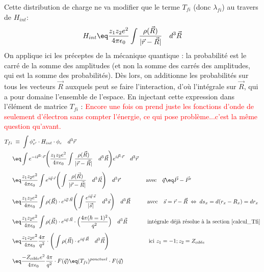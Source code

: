 Cette distribution de charge ne va modifier que le terme $T_{fi}$ (donc $\lambda_{fi}$) au travers de $H_{int}$:
$$H_{int} \eq \frac{z_1z_2e^2}{4\pi\epsilon_0} \int \frac{\rho(\vec{R})}{|\vec{r} - \vec{R}|} \quad d^3\vec{R}$$ On applique ici les préceptes de la mécanique quantique : la probabilité est le carré de la somme des amplitudes (et non la somme des carrés des amplitudes, qui est la somme des probabilités). Dès lors, on additionne les probabilités sur tous les vecteurs $\vec{R}$ auxquels peut se faire l'interaction, d'où l'intégrale sur $\vec{R}$, qui a pour domaine l'ensemble de l'espace. En injectant cette expression dans l'élément de matrice $T_{fi}$ : \textcolor{red}{Encore une fois on prend juste les fonctions d'onde de seulement d'électron sans compter l'énergie, ce qui pose problème...c'est la même question qu'avant.}
\begin{align*}
    T_{fi} 
&\; \equiv \;
    \int \phi^*_{e'} \cdot H_{int} \cdot \phi_e \quad d^3\vec{r}\\
&\eq 
    \int 
    e^{-i\vec{P'} \cdot\vec{r}}
    \Bigg(
        \dfrac{z_1z_2e^2}{4\pi\epsilon_0} \int \dfrac{\rho(\vec{R})}{|\vec{r} - \vec{R}|} \quad d^3\vec{R}
    \Bigg)
    e^{i\vec{P} \cdot\vec{r}}
    \quad d^3\vec{r}\\[4pt]
& \eq 
    \dfrac{z_1z_2e^2}{4\pi\epsilon_0} \int 
    e^{i\vec{q} \cdot\vec{r}}
    \Bigg(
         \int \dfrac{\rho(\vec{R})}{|\vec{r} - \vec{R}|} \quad d^3\vec{R}
    \Bigg)
    \quad d^3\vec{r}
    \qquad \qquad \;\; \text{avec} \quad \vec{q} \eq \vec{P}-\vec{P'}
    \\[4pt]
& \eq 
    \dfrac{z_1z_2e^2}{4\pi\epsilon_0} \int 
    \rho(\vec{R}) \cdot e^{i\vec{q} \cdot\vec{R}}
    \Bigg(
         \int \dfrac{ e^{i\vec{q} \cdot\vec{s}}   }{|\vec{s}|} \quad d^3\vec{s}
    \Bigg)
    \quad d^3\vec{R}
    \qquad \quad \text{avec} \quad \vec{s} = \vec{r}-\vec{R} \; \Leftrightarrow \; ds_x = d(r_x - R_x) = dr_x
    \\[4pt]
& \eq 
    \dfrac{z_1z_2e^2}{4\pi\epsilon_0} \int 
    \rho(\vec{R}) \cdot e^{i\vec{q} \cdot\vec{R}}
    \cdot \Big( \dfrac{4\pi(\hbar = 1)^2}{q^2} \Big)
    \quad d^3\vec{R}
    \qquad \quad \;\; \text{intégrale déjà résolue à la section \eqref{calcul_Tfi}}
    \\[4pt]
& \eq 
    \dfrac{z_1z_2e^2}{4\pi\epsilon_0} \dfrac{4\pi}{q^2} \cdot
    \Bigg(
    \int 
    \rho(\vec{R}) \cdot e^{i\vec{q} \cdot\vec{R}}
    \quad d^3\vec{R}
    \Bigg)
    \qquad \qquad \qquad \quad \text{ici  }  z_1 = -1; z_2 = Z_{cible}
    \\[4pt]
& \eq 
    \dfrac{-Z_{cible}e^2}{4\pi\epsilon_0} \dfrac{4\pi}{q^2}
    \cdot F(\vec{q})
    \eq
    (T_{fi})^{ponctuel} \cdot F(\vec{q})
    \\
\end{align*}
